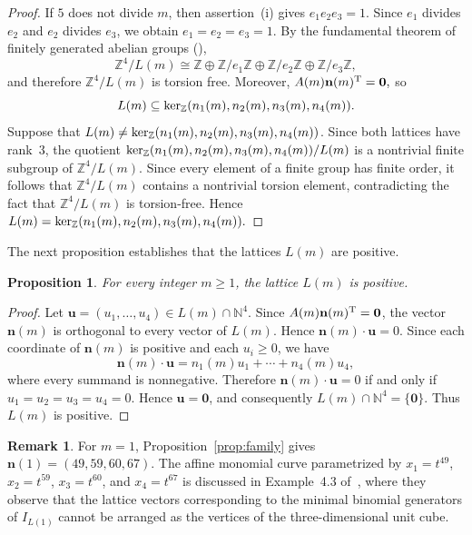 \documentclass[12pt,a4paper]{amsart}
\newtheorem{proposition}[theorem]{Proposition}
\theoremstyle{definition}
\newtheorem{remark}[theorem]{Remark}
\begin{document}
\begin{proof}
If $5$ does not divide $m$, then assertion~\textup{(i)} gives
$e_1e_2e_3=1$.
Since $e_1$ divides $e_2$ and $e_2$ divides $e_3$, we obtain
$e_1=e_2=e_3=1$.
By the fundamental theorem of finitely generated abelian groups
(\cite[Section~12.1]{DF}),
\[
\mathbb Z^4/L(m)
\cong
\mathbb Z
\oplus
\mathbb Z/e_1\mathbb Z
\oplus
\mathbb Z/e_2\mathbb Z
\oplus
\mathbb Z/e_3\mathbb Z,
\]
and therefore $\mathbb Z^4/L(m)$ is torsion free.
Moreover,
$
A(m)\mathbf n(m)^{\mathrm T}={\bf 0},$
so
$$
L(m) \subseteq {\rm ker}_{\mathbb Z}(n_{1}(m),n_{2}(m),n_{3}(m),n_{4}(m)).$$
Suppose that $L(m) \neq {\rm ker}_{\mathbb Z}(n_{1}(m),n_{2}(m),n_{3}(m),n_{4}(m))$. Since both lattices have
rank~$3$, the quotient
${\rm ker}_{\mathbb Z}(n_{1}(m),n_{2}(m),n_{3}(m),n_{4}(m))/L(m)$
is a nontrivial finite subgroup of $\mathbb Z^4/L(m)$. Since every element of a finite group has finite order, it follows that $\mathbb Z^4/L(m)$ contains a nontrivial torsion element, contradicting the fact that
$\mathbb Z^4/L(m)$ is torsion-free. Hence
$
L(m)={\rm ker}_{\mathbb Z}(n_{1}(m),n_{2}(m),n_{3}(m),n_{4}(m)).$
\end{proof}

The next proposition establishes that the lattices $L(m)$ are
positive.

\begin{proposition}
\label{prop:positive}
For every integer $m\ge1$, the lattice $L(m)$ is positive.
\end{proposition}

\begin{proof}
Let $\mathbf u=(u_1,\ldots,u_4)\in L(m)\cap\mathbb N^4$. Since
$A(m)\mathbf n(m)^{\mathrm T}={\bf 0}$, the vector $\mathbf n(m)$ is
orthogonal to every vector of $L(m)$. Hence
$
\mathbf n(m)\cdot\mathbf u=0.$
Since each coordinate of $\mathbf n(m)$ is positive and each
$u_i\ge0$, we have
\[
\mathbf n(m)\cdot\mathbf u
=
n_1(m)u_1+\cdots+n_4(m)u_4,
\]
where every summand is nonnegative. Therefore
$\mathbf n(m)\cdot\mathbf u=0$ if and only if
$u_1=u_2=u_3=u_4=0$. Hence
$\mathbf u=\mathbf0$, and consequently
$
L(m)\cap\mathbb N^4=\{\mathbf0\}.$
Thus $L(m)$ is positive.
\end{proof}

\begin{remark}
For $m=1$, Proposition~\ref{prop:family} gives
$\mathbf n(1)=(49,59,60,67).$ The affine monomial curve parametrized by
$x_1=t^{49}$, $x_2=t^{59}$, $x_3=t^{60}$, and $x_4=t^{67}$
is discussed in Example~4.3 of~\cite{OP},
where they observe that the lattice vectors
corresponding to the minimal binomial generators of $I_{L(1)}$
cannot be arranged as the vertices of the three-dimensional unit cube.
\end{remark}
\end{document}

